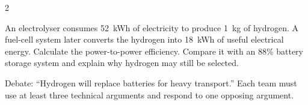 \begin{multicols}{2}
\begin{applicationexercise}
An electrolyser consumes 52~kWh of electricity to produce 1~kg of hydrogen. A fuel-cell system later converts the hydrogen into 18~kWh of useful electrical energy. Calculate the power-to-power efficiency. Compare it with an 88\% battery storage system and explain why hydrogen may still be selected.
\end{applicationexercise}

\begin{speaking}
Debate: ``Hydrogen will replace batteries for heavy transport.'' Each team must use at least three technical arguments and respond to one opposing argument.
\end{speaking}
\end{multicols}